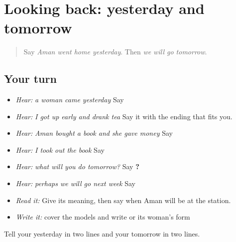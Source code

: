 \section[\texorpdfstring{\pa{ਗਿਆ} · \pa{ਪੀਤੀ} · \pa{ਜਾਵਾਂਗੇ} (giā · pītī …)}{ਗਿਆ · ਪੀਤੀ · ਜਾਵਾਂਗੇ (giā · pītī …)}]{Looking back: yesterday and tomorrow}

\label{lesson:PA-R224-second-pass-past-and-future}



\begin{quote}
Say \emph{Aman went home yesterday}. Then \emph{we will go tomorrow}.
\end{quote}

\subsection*{Your turn}
\begin{itemize}
\raggedright
  \item \emph{Hear:} \emph{a woman came yesterday} Say \textbf{  }
  \item \emph{Hear:} \emph{I got up early and drank tea} Say it with the ending that fits you.
  \item \emph{Hear:} \emph{Aman bought a book and she gave money} Say \textbf{        }
  \item \emph{Hear:} \emph{I took out the book} Say \textbf{  }
  \item \emph{Hear:} \emph{what will you do tomorrow?} Say \textbf{   ?}
  \item \emph{Hear:} \emph{perhaps we will go next week} Say \textbf{    }
  \item \emph{Read it:} \textbf{   } Give its meaning, then say when Aman will be at the station.
  \item \emph{Write it:} cover the models and write \textbf{    } or its woman's form
\end{itemize}

\begin{tcolorbox}[breakable,colback=teal!4,colframe=teal!35!black,title={Before you move on}]
Tell your yesterday in two lines and your tomorrow in two lines.
\end{tcolorbox}
